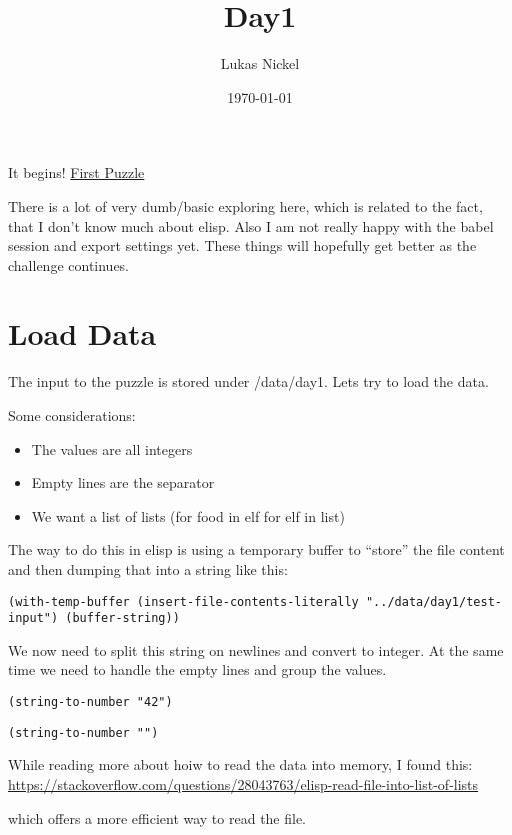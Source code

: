 \documentclass[11pt]{article}
\author{Lukas Nickel}
\date{\today}
\title{Day1}
\begin{document}
\maketitle
\tableofcontents

It begins!
\href{https://adventofcode.com/2022/day/1}{First Puzzle}

There is a lot of very dumb/basic exploring here, which is related to the fact, that
I don't know much about elisp.
Also I am not really happy with the babel session and export settings yet.
These things will hopefully get better as the challenge continues.

\section{Load Data}
\label{sec:org184aa8e}
The input to the puzzle is stored under /data/day1.
Lets try to load the data.

Some considerations:
\begin{itemize}
\item The values are all integers
\item Empty lines are the separator
\item We want a list of lists (for food in elf for elf in list)
\end{itemize}

The way to do this in elisp is using a temporary buffer to ``store'' the
file content and then dumping that into a string like this:

\begin{verbatim}
(with-temp-buffer (insert-file-contents-literally "../data/day1/test-input") (buffer-string))
\end{verbatim}


We now need to split this string on newlines and convert to integer.
At the same time we need to handle the empty lines and group the values.

\begin{verbatim}
(string-to-number "42")
\end{verbatim}

\begin{verbatim}
(string-to-number "")
\end{verbatim}

While reading more about hoiw to read the data into memory, I found this:
\url{https://stackoverflow.com/questions/28043763/elisp-read-file-into-list-of-lists}

which offers a more efficient way to read the file.
\end{document}
